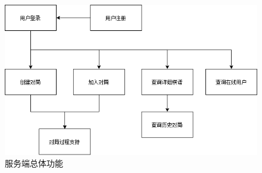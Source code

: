\documentclass[utf8]{article}
\begin{document}
\begin{figure}[htbp]
    \centering
    \includegraphics[width=\textwidth]{pictures/2}
    \caption{服务端总体功能}
\end{figure}
\end{document}
